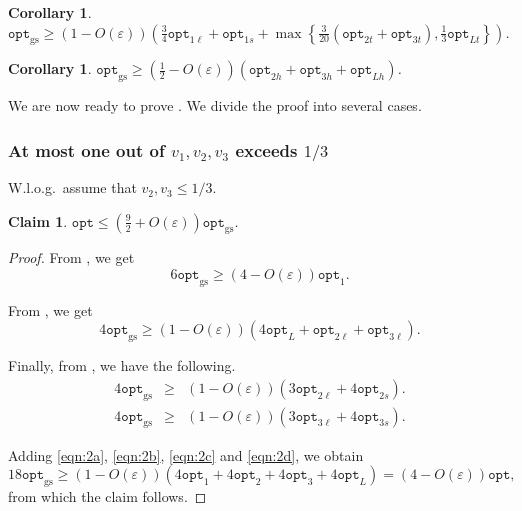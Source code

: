 \documentclass[10pt,a4paper]{amsart}
\renewcommand{\epsilon}{\varepsilon} %
\newtheorem{claim}[theorem]{Claim}
\newtheorem{corollary}[theorem]{Corollary}
\theoremstyle{definition}
\newcommand{\alg}{\mathtt{opt}_{\mathrm{gs}}}
\newcommand{\opt}{\mathtt{opt}}
\newcommand{\optgs}{\mathtt{opt}_{\mathrm{gs}}}
\newcommand{\optonel}{\mathtt{opt}_{1\ell}}
\newcommand{\optones}{\mathtt{opt}_{1s}}
\newcommand{\opttwol}{\mathtt{opt}_{2\ell}}
\newcommand{\opttwos}{\mathtt{opt}_{2s}}
\newcommand{\optthreel}{\mathtt{opt}_{3\ell}}
\newcommand{\optthrees}{\mathtt{opt}_{3s}}
\newcommand{\opttwot}{\mathtt{opt}_{2t}}
\newcommand{\opttwoh}{\mathtt{opt}_{2h}}
\newcommand{\optthreet}{\mathtt{opt}_{3t}}
\newcommand{\optthreeh}{\mathtt{opt}_{3h}}
\newcommand{\optlt}{\mathtt{opt}_{Lt}}
\newcommand{\optlh}{\mathtt{opt}_{Lh}}
\begin{document}
\begin{corollary}
\label{cor:combinepacking}
    $\displaystyle\optgs \ge (1-O(\epsilon))\left(\frac{3}{4}\optonel+\optones+\max\left\{\frac{3}{20}(\opttwot+\optthreet),\frac{1}{3}\optlt\right\}\right)$.
\end{corollary}


\begin{corollary}
\label{cor:2dknapsackcontainer}
    $\displaystyle\optgs \ge \left(\frac{1}{2}-O(\epsilon)\right)(\opttwoh+\optthreeh+\optlh)$.
\end{corollary}

We are now ready to prove . We divide the proof into several cases. 

\subsubsection{At most one out of \texorpdfstring{$v_1,v_2,v_3$}{v1, v2, v3} exceeds \texorpdfstring{$1/3$}{1/3}}
W.l.o.g.~assume that $v_2,v_3 \le 1/3$.

\begin{claim}
\label{cla:9by2}
    $\displaystyle\opt \le \left(\frac{9}{2}+O(\epsilon)\right)\alg$.
\end{claim}
\begin{proof}
    From , we get 
    \begin{equation}
    \label{eqn:2a}
        6\alg \ge (4-O(\epsilon))\opt_1.
    \end{equation}

    From , we get
    \begin{equation}
    \label{eqn:2b}
        4\alg \ge (1-O(\epsilon))(4\opt_L + \opttwol+\optthreel).
    \end{equation}

    Finally, from , we have the following.
    \begin{eqnarray}
        4\alg &\ge& (1-O(\epsilon))(3\opttwol + 4\opttwos).    \label{eqn:2c}\\
        4\alg &\ge& (1-O(\epsilon))(3\optthreel + 4\optthrees).    \label{eqn:2d}
    \end{eqnarray}

    Adding \eqref{eqn:2a}, \eqref{eqn:2b}, \eqref{eqn:2c} and \eqref{eqn:2d}, we obtain
    \[ 18\alg \ge (1-O(\epsilon))(4\opt_1 + 4\opt_2 + 4\opt_3 + 4\opt_L) = (4-O(\epsilon))\opt,\]
    from which the claim follows.
\end{proof}
\end{document}
